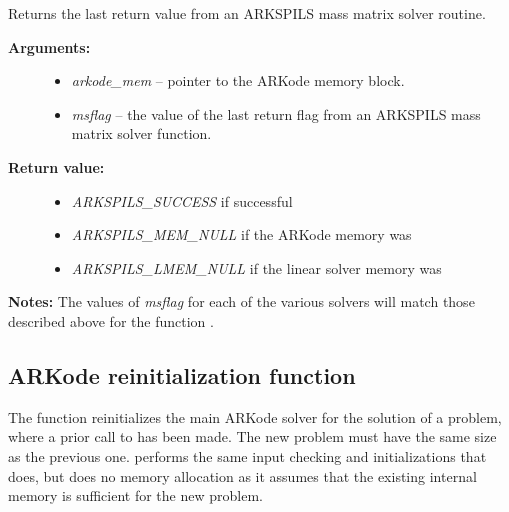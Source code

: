 \documentclass[letterpaper,10pt,english]{sphinxmanual}
\begin{document}
\begin{fulllineitems}
\label{c_interface/User_callable:ARKSpilsGetLastMassFlag}
Returns the last return value from an ARKSPILS mass matrix solver routine.
\begin{description}
\item[{\textbf{Arguments:}}] \leavevmode\begin{itemize}
\item {} 
\emph{arkode\_mem} -- pointer to the ARKode memory block.

\item {} 
\emph{msflag} -- the value of the last return flag from an
ARKSPILS mass matrix solver function.

\end{itemize}

\item[{\textbf{Return value:}}] \leavevmode\begin{itemize}
\item {} 
\emph{ARKSPILS\_SUCCESS} if successful

\item {} 
\emph{ARKSPILS\_MEM\_NULL} if the ARKode memory was 

\item {} 
\emph{ARKSPILS\_LMEM\_NULL} if the linear solver memory was 

\end{itemize}

\end{description}

\textbf{Notes:} The values of \emph{msflag} for each of the various solvers
will match those described above for the function
{\hyperref[c_interface/User_callable:ARKSpilsGetLastFlag]{}}.

\end{fulllineitems}



\subsection{ARKode reinitialization function}
\label{c_interface/User_callable:cinterface-reinitialization}\label{c_interface/User_callable:arkode-reinitialization-function}
The function {\hyperref[c_interface/User_callable:ARKodeReInit]{}} reinitializes the main ARKode
solver for the solution of a problem, where a prior call to
{\hyperref[c_interface/User_callable:ARKodeInit]{}} has been made. The new problem must have the
same size as the previous one.  {\hyperref[c_interface/User_callable:ARKodeReInit]{}} performs the
same input checking and initializations that {\hyperref[c_interface/User_callable:ARKodeInit]{}}
does, but does no memory allocation as it assumes that the existing
internal memory is sufficient for the new problem.
\end{document}

